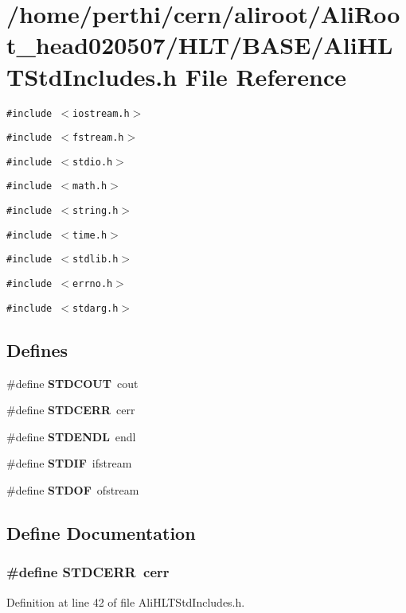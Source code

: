 \section{/home/perthi/cern/aliroot/Ali\-Root\_\-head020507/HLT/BASE/Ali\-HLTStd\-Includes.h File Reference}
\label{AliHLTStdIncludes_8h}


{\tt \#include $<$iostream.h$>$}\par
{\tt \#include $<$fstream.h$>$}\par
{\tt \#include $<$stdio.h$>$}\par
{\tt \#include $<$math.h$>$}\par
{\tt \#include $<$string.h$>$}\par
{\tt \#include $<$time.h$>$}\par
{\tt \#include $<$stdlib.h$>$}\par
{\tt \#include $<$errno.h$>$}\par
{\tt \#include $<$stdarg.h$>$}\par
\subsection*{Defines}
\begin{CompactItemize}
\item 
\#define {\bf STDCOUT}\ cout
\item 
\#define {\bf STDCERR}\ cerr
\item 
\#define {\bf STDENDL}\ endl
\item 
\#define {\bf STDIF}\ ifstream
\item 
\#define {\bf STDOF}\ ofstream
\end{CompactItemize}


\subsection{Define Documentation}
\subsubsection{\setlength{\rightskip}{0pt plus 5cm}\#define STDCERR\ cerr}\label{AliHLTStdIncludes_8h_a1}




Definition at line 42 of file Ali\-HLTStd\-Includes.h.
